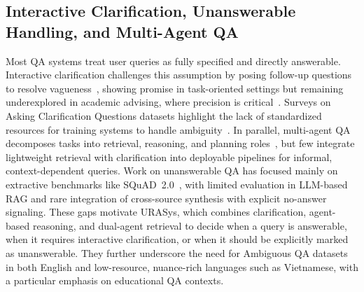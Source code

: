 \documentclass[11pt]{article}
\begin{document}
\subsection{Interactive Clarification, Unanswerable Handling, and Multi-Agent QA}
Most QA systems treat user queries as fully specified and directly answerable. Interactive clarification challenges this assumption by posing follow-up questions to resolve vagueness~\cite{guo2021abgcoqa}, showing promise in task-oriented settings but remaining underexplored in academic advising, where precision is critical~\cite{10.1145/3626772.3657843}. Surveys on Asking Clarification Questions datasets highlight the lack of standardized resources for training systems to handle ambiguity~\cite{rahmani2023acqsurvey}. In parallel, multi-agent QA decomposes tasks into retrieval, reasoning, and planning roles~\cite{VISWANATHAN2022100057,elizabeth-etal-2025-exploring,10.1145/3715097}, but few integrate lightweight retrieval with clarification into deployable pipelines for informal, context-dependent queries. Work on unanswerable QA has focused mainly on extractive benchmarks like SQuAD~2.0~\cite{rajpurkar-etal-2018-know}, with limited evaluation in LLM-based RAG and rare integration of cross-source synthesis with explicit no-answer signaling. These gaps motivate URASys, which combines clarification, agent-based reasoning, and dual-agent retrieval to decide when a query is answerable, when it requires interactive clarification, or when it should be explicitly marked as unanswerable. They further underscore the need for Ambiguous QA datasets in both English and low-resource, nuance-rich languages such as Vietnamese, with a particular emphasis on educational QA contexts.










\end{document}
